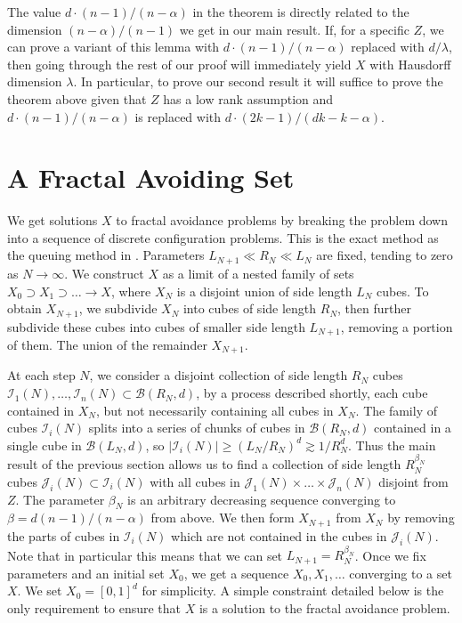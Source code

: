 \documentclass{article}
\theoremstyle{plain}
\theoremstyle{plain}
\begin{document}
\begin{multicols}{2}
The value $d \cdot (n-1)/(n-\alpha)$ in the theorem is directly related to the dimension $(n-\alpha)/(n-1)$ we get in our main result. If, for a specific $Z$, we can prove a variant of this lemma with $d \cdot (n-1)/(n-\alpha)$ replaced with $d/\lambda$, then going through the rest of our proof will immediately yield $X$ with Hausdorff dimension $\lambda$. In particular, to prove our second result it will suffice to prove the theorem above given that $Z$ has a low rank assumption and $d \cdot (n-1)/(n-\alpha)$ is replaced with $d \cdot(2k-1)/(dk - k - \alpha)$.


\section{A Fractal Avoiding Set}

We get solutions $X$ to fractal avoidance problems by breaking the problem down into a sequence of discrete configuration problems. This is the exact method as the queuing method in \cite{MalabikaRob}. Parameters $L_{N+1} \ll R_N \ll L_N$ are fixed, tending to zero as $N \to \infty$. We construct $X$ as a limit of a nested family of sets $X_0 \supset X_1 \supset \dots \to X$, where $X_N$ is a disjoint union of side length $L_N$ cubes. To obtain $X_{N+1}$, we subdivide $X_N$ into cubes of side length $R_N$, then further subdivide these cubes into cubes of smaller side length $L_{N+1}$, removing a portion of them. The union of the remainder $X_{N+1}$.

At each step $N$, we consider a disjoint collection of side length $R_N$ cubes $\mathcal{I}_1(N), \dots, \mathcal{I}_n(N) \subset \mathcal{B}(R_N,d)$, by a process described shortly, each cube contained in $X_N$, but not necessarily containing all cubes in $X_N$. The family of cubes $\mathcal{I}_i(N)$ splits into a series of chunks of cubes in $\mathcal{B}(R_N,d)$ contained in a single cube in $\mathcal{B}(L_N,d)$, so $|\mathcal{I}_i(N)| \geq (L_N/R_N)^d \gtrsim 1/R_N^d$. Thus the main result of the previous section allows us to find a collection of side length $R_N^{\beta_N}$ cubes $\mathcal{J}_i(N) \subset \mathcal{I}_i(N)$ with all cubes in $\mathcal{J}_1(N) \times \dots \times \mathcal{J}_n(N)$ disjoint from $Z$. The parameter $\beta_N$ is an arbitrary decreasing sequence converging to $\beta = d(n-1)/(n-\alpha)$ from above. We then form $X_{N+1}$ from $X_N$ by removing the parts of cubes in $\mathcal{I}_i(N)$ which are not contained in the cubes in $\mathcal{J}_i(N)$. Note that in particular this means that we can set $L_{N+1} = R_N^{\beta_N}$. Once we fix parameters and an initial set $X_0$, we get a sequence $X_0, X_1, \dots$ converging to a set $X$. We set $X_0 = [0,1]^d$ for simplicity. A simple constraint detailed below is the only requirement to ensure that $X$ is a solution to the fractal avoidance problem.


\end{multicols}
\end{document}
